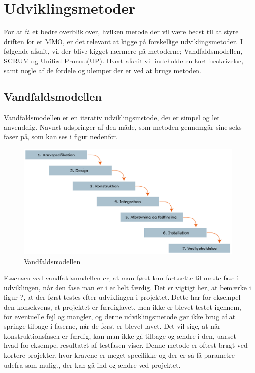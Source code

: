 \chapter{Udviklingsmetoder}
For at få et bedre overblik over, hvilken metode der vil være bedst til at styre driften for et MMO, er det relevant at kigge på forskellige udviklingsmetoder. I følgende afsnit, vil der blive kigget nærmere på metoderne; Vandfaldsmodellen, SCRUM og Unified Process(UP). Hvert afsnit vil indeholde en kort beskrivelse, samt nogle af de fordele og ulemper der er ved at bruge metoden.\\
\section{Vandfaldsmodellen}
Vandfaldsmodellen er en iterativ udviklingsmetode, der er simpel og let anvendelig.\cite{Waterfall} 
Navnet udspringer af den måde, som metoden gennemgår sine seks faser på, som kan ses i figur nedenfor.\\

\begin{figure}[!ht]
\centering
\begin{center}
\includegraphics[scale=0.5]{./vandfaldmodel.eps}
\caption{Vandfaldsmodellen}
\end{center}
\end{figure}

Essensen ved vandfaldsmodellen er, at man først kan fortsætte til næste fase i udviklingen, når den fase man er i er helt færdig. Det er vigtigt her, at bemærke i figur ?, at der først testes efter udviklingen i projektet. Dette har for eksempel den konsekvens, at projektet er færdiglavet, men ikke er blevet testet igennem, for eventuelle fejl og mangler, og denne udviklingsmetode gør ikke brug af at springe tilbage i faserne, når de først er blevet lavet.
Det vil sige, at når konstruktionsfasen er færdig, kan man ikke gå tilbage og ændre i den, uanset hvad for eksempel resultatet af testfasen viser. Denne metode er oftest brugt ved kortere projekter, hvor kravene er meget specifikke og der er så få parametre udefra som muligt, der kan gå ind og ændre ved projektet.\\


